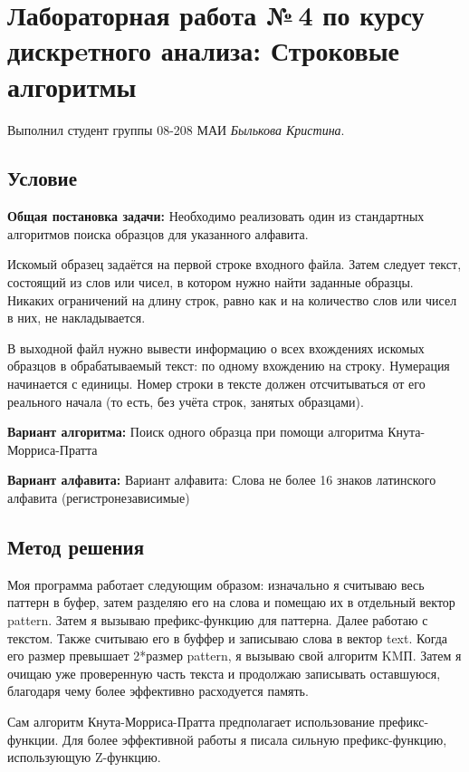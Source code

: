 \documentclass[12pt]{article}
\begin{document}
\section*{Лабораторная работа №\,4 по курсу дискрeтного анализа: Строковые алгоритмы}

\noindent Выполнил студент группы 08-208 МАИ \textit{Былькова Кристина}.

\subsection*{Условие}
\textbf{Общая постановка задачи:} Необходимо реализовать один из стандартных алгоритмов поиска образцов для указанного алфавита. 

Искомый образец задаётся на первой строке входного файла.
Затем следует текст, состоящий из слов или чисел, в котором нужно найти заданные образцы. Никаких ограничений на длину строк, равно как и на количество слов или чисел в них, не накладывается.

В выходной файл нужно вывести информацию о всех вхождениях искомых образцов в обрабатываемый текст: по одному вхождению на строку. Нумерация начинается с единицы. Номер строки в тексте должен отсчитываться от его реального начала (то есть, без учёта строк, занятых образцами).

\textbf{Вариант алгоритма:} Поиск одного образца при помощи алгоритма Кнута-Морриса-Пратта

\textbf{Вариант алфавита:} Вариант алфавита: Слова не более 16 знаков латинского алфавита (регистронезависимые)

\subsection*{Метод решения}

Моя программа работает следующим образом: изначально я считываю весь паттерн в буфер, затем разделяю его на слова и помещаю их в отдельный вектор pattern. Затем я вызываю префикс-функцию для паттерна. Далее работаю с текстом. Также считываю его в буффер и записываю слова в вектор text. Когда его размер превышает 2*размер pattern, я вызываю свой алгоритм KMП. Затем я очищаю уже проверенную часть текста и продолжаю записывать оставшуюся, благодаря чему более эффективно расходуется память.

Сам алгоритм Кнута-Морриса-Пратта предполагает использование префикс-функции. Для более эффективной работы я писала сильную префикс-функцию, использующую Z-функцию.
\end{document}
